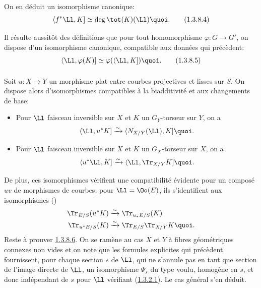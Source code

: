 On en déduit un isomorphisme canonique:
\begin{equation*}
\langle f^{\ast}\Ll,K]\simeq \deg\tot(K)(\Ll){\quoi}.\tag{1.3.8.4}
\end{equation*}

Il résulte aussitôt des définitions que pour tout homomorphisme
$\varphi:G\rightarrow G'$, on dispose d'un isomorphisme canonique,
compatible aux données qui précèdent:
\begin{equation*}
\langle \Ll,\varphi(K)]\simeq \varphi(\langle \Ll,K]){\quoi}.\tag{1.3.8.5}
\end{equation*}

\setcounter{paragraph}{5}
\paragraph{}
Soit $u:X\rightarrow Y$ un morphisme plat entre courbes projectives et
lisses sur $S$. On dispose alors d'isomorphismes compatibles à la
biadditivité et aux changements de base:
\begin{itemize}
\item[--] Pour $\Ll$ faisceau inversible sur $X$ et $K$ un
$G_{Y}$-torseur sur $Y$, on a
$$
\langle \Ll, u^{\ast}K]\xrightarrow{\sim}\langle N_{X/Y}(\Ll),K]{\quoi}.
$$

\item[--] Pour $\Ll$ faisceau inversible sur $X$ et $K$ un
$G_{X}$-torseur sur $X$, on a
$$
\langle u^{\ast}\Ll,K]\xrightarrow{\sim}
\langle \Ll,\Tr_{X/Y}K]{\quoi}.
$$
\end{itemize}
De plus, ces isomorphismes vérifient une compatibilité évidente pour
un composé $uv$ de morphismes de courbes; pour $\Ll=\Oo(E)$,
ils s'identifient aux isomorphismes ()
\begin{align*}
\Tr_{E/S}(u^{\ast}K) &\xrightarrow{\sim} \Tr_{u_{\ast}E/S}(K)\\
\Tr_{u^{\ast}E/S}(K) &\xrightarrow{\sim} \Tr_{E/S}\Tr_{X/Y}K{\quoi}.
\end{align*}
Reste à prouver \hyperref[XVIII.par1.3.8.6]{1.3.8.6}. On se ramène au cas $X$ et $Y$ à fibres
géométriques connexes non vides et on note que les formules explicites
qui précèdent fournissent, pour chaque section $s$ de $\Ll$,
qui ne s'annule pas en tant que section de l'image directe de
$\Ll$, un isomorphisme $\Psi_{s}$ du type voulu, homogène en
$s$, et donc indépendant de $s$ pour $\Ll$ vérifiant
(\hyperref[XVIII.par1.3.2.1]{1.3.2.1}). Le cas général s'en déduit.


